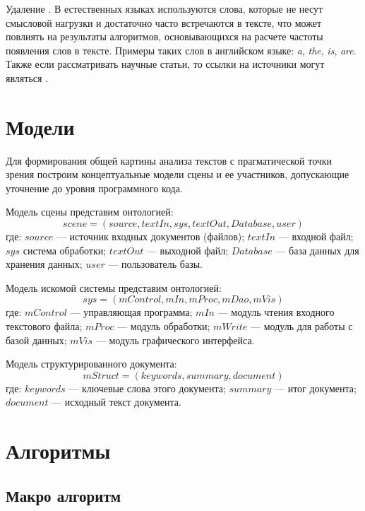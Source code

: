Удаление . В естественных языках используются слова, которые не несут смысловой нагрузки и достаточно часто встречаются в тексте, что может повлиять на результаты алгоритмов, основывающихся на расчете частоты появления слов в тексте. Примеры таких слов в английском языке: \textit{a}, \textit{the}, \textit{is}, \textit{are}. Также если рассматривать научные статьи, то ссылки на источники могут являться .

\section{Модели}

Для формирования общей картины анализа текстов с прагматической точки зрения построим концептуальные модели сцены и ее участников, допускающие уточнение до уровня программного кода.

Модель сцены представим онтологией:
\begin{equation}
\label{eq:scene}
scene = (source, textIn, sys, textOut, Database, user)
\end{equation}
где: $source$ --- источник входных документов (файлов); $textIn$ --- входной файл; $sys$ система обработки; $textOut$ --- выходной файл; $Database$ --- база данных для хранения данных; $user$ --- пользователь базы.

Модель искомой системы представим онтологией:
\begin{equation}
\label{eq:system}
sys = (mControl, mIn, mProc, mDao, mVis)
\end{equation}
где: $mControl$ --- управляющая программа; $mIn$ --- модуль чтения входного текстового файла; $mProc$ --- модуль обработки; $mWrite$ --- модуль для работы с базой данных; $mVis$ --- модуль графического интерфейса.


Модель структурированного документа:
\begin{equation}
mStruct = (keywords, summary, document)
\end{equation}
где: $keywords$ --- ключевые слова этого документа; $summary$ --- итог документа; $document$ --- исходный текст документа.

\section{Алгоритмы}

\subsection{Макро алгоритм}

